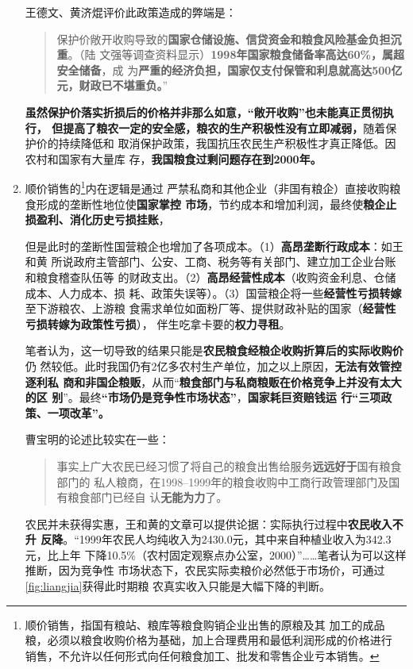 \begin{enumerate}
  王德文、黄济焜评价此政策造成的弊端是：
  \begin{quotation}
    保护价敞开收购导致的\textbf{国家仓储设施、信贷资金和粮食风险基金负担沉重}。（陆
    文强等调查资料显示）\textbf{1998年国家粮食储备率高达60\%，属超安全储备}，成
    为\textbf{严重的经济负担，国家仅支付保管和利息就高达500亿元，财政已不堪重负。}”
  \end{quotation}

  \textbf{虽然保护价落实折损后的价格并非那么如意，“敞开收购”也未能真正贯彻执行，
    但提高了粮农一定的安全感，粮农的生产积极性没有立即减弱，}随着保护价的持续降低和
  取消保护政策，我国抗压农民生产积极性才真正降低。因农村和国家有大量库
  存，\textbf{我国粮食过剩问题存在到2000年。}

\item 顺价销售的\footnote{顺价销售，指国有粮站、粮库等粮食购销企业出售的原粮及其
    加工的成品粮，必须以粮食收购价格为基础，加上合理费用和最低利润形成的价格进行
    销售，不允许以任何形式向任何粮食加工、批发和零售企业亏本销售。}内在逻辑是通过
  严禁私商和其他企业（非国有粮企）直接收购粮食形成的垄断性地位使\textbf{国家掌控
    市场}，节约成本和增加利润，最终使\textbf{粮企止损盈利、消化历史亏损挂账}，

  但是此时的垄断性国营粮企也增加了各项成本。（1）\textbf{高昂垄断行政成本}：如王和黄
  所说政府主管部门、公安、工商、税务等有关部门、建立加工企业台账和粮食稽查队伍等
  的财政支出。（2）\textbf{高昂经营性成本}（收购资金利息、仓储成本、人力成本、损
  耗、政策失误等）。（3）国营粮企将一些\textbf{经营性亏损转嫁}至下游粮农、上游粮
  食需求单位如面粉厂等、提供财政补贴的国家（\textbf{经营性亏损转嫁为政策性亏损}），
  伴生吃拿卡要的\textbf{权力寻租}。

  笔者认为，这一切导致的结果只能是\textbf{农民粮食经粮企收购折算后的实际收购价}仍
  然较低。此时我国仍有2亿多农村生产单位，加之以上原因，\textbf{无法有效管控逐利私
    商和非国企粮贩}，从而“\textbf{粮食部门与私商粮贩在价格竞争上并没有太大的区
    别}”。最终\textbf{“市场仍是竞争性市场状态”}，\textbf{国家耗巨资赔钱运
    行“三项政策、一项改革”。}

  曹宝明的论述比较实在一些：
  \begin{quotation}
    事实上广大农民已经习惯了将自己的粮食出售给服务\textbf{远远好于}国有粮食部门的
    私人粮商，在1998--1999年的粮食收购中工商行政管理部门及国有粮食部门已经自
    认\textbf{无能为力}了。\cite{caobaoming01}
  \end{quotation}

  农民并未获得实惠，王和黄的文章可以提供论据：实际执行过程中\textbf{农民收入不升
    反降}。“1999年农民人均纯收入为2430.0元，其中来自种植业收入为342.3元，比上年
  下降10.5\%（农村固定观察点办公室，2000）”……笔者认为可以这样推断，因为竞争性
  市场状态下，农民实际卖粮价必然低于市场价，可通过\cref{fig:liangjia}获得此时期粮
  农真实收入只能是大幅下降的判断。


\end{enumerate}
